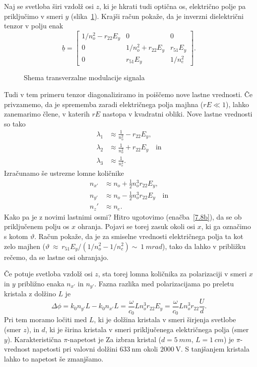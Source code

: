 Naj se svetloba širi vzdolž osi $z$, ki je hkrati tudi optična os, 
električno polje pa priključimo v smeri $y$ (slika~\ref{fig:tmshema}). 
Krajši račun pokaže, da je inverzni dielektrični tenzor v polju enak
\begin{equation}
\underline{b} = 
 \left[\begin{array}{ccc}
1/n_o^2  -r_{22}E_y& 0& 0\\
0& 1/n_o^2+r_{22}E_y& r_{51}E_y\\
0 & r_{51}E_y&  1/n_e^2
\end{array}\right].
\label{7.8b}
\end{equation}

\begin{figure}[ht]
\centering
\def\svgwidth{80truemm} 

\caption{Shema transverzalne modulacije signala}
\label{fig:tmshema}
\end{figure}

Tudi v tem primeru tenzor diagonaliziramo in poiščemo nove lastne vrednosti.
Če privzamemo, da je sprememba zaradi električnega polja majhna ($rE\ll1$), lahko
zanemarimo člene, v katerih $rE$ nastopa v kvadratni obliki. Nove lastne vrednosti so tako
\begin{align}
\lambda_1 &\approx \frac{1}{n_o^2}-r_{22}E_y, \\
\lambda_2 &\approx \frac{1}{n_o^2}+ r_{22}E_y\quad \mathrm{in} \\
\lambda_3 &\approx \frac{1}{n_e^2}.
\end{align}
Izračunamo še ustrezne lomne količnike 
\begin{align}
n_{x'} &\approx n_o+\frac{1}{2}n_o^3r_{22}E_y,\\
n_{y'} &\approx n_o-\frac{1}{2}n_o^3r_{22}E_y \quad \mathrm{in}\\
n_z' &\approx n_e.
\end{align}
Kako pa je z novimi lastnimi osmi? 
Hitro ugotovimo (enačba~\ref{7.8b}), da se ob
priključenem polju os $x$ ohranja. Pojavi se torej zasuk okoli osi $x$,
ki ga označimo s kotom $\vartheta$. Račun pokaže, da je za smiselne
vrednosti električnega polja ta kot zelo majhen ($\vartheta~
\approx~r_{51}E_y/(1/n_o^2-1/n_e^2) \sim~1~\si{mrad}$),
tako da lahko v približku rečemo, da se lastne osi ohranjajo. 

Če potuje svetloba vzdolž osi $z$, sta torej lomna količnika za 
polarizaciji v smeri $x$ in $y$ približno enaka $n_{x'}$ in $n_{y'}$. Fazna razlika med 
polarizacijama po preletu kristala z dolžino $L$ je 
\begin{equation}
\Delta \phi = k_0 n_{y'} L - k_0 n_{x'} L = \frac{\omega}{c_0}L 
n_o^3 r_{22}E_y = \frac{\omega}{c_0}L n_o^3 r_{22}\frac{U}{d}.
\label{fazaTM}
\end{equation}
Pri tem moramo ločiti med $L$, ki je dolžina kristala v smeri širjenja svetlobe
(smer $z$), in $d$, ki je širina kristala v smeri priključenega električnega polja 
(smer $y$). 
Karakteristična $\pi$-napetost je 
Za izbran kristal ($d=5~\si{mm}$, $L=1~\si{cm}$) je $\pi$-vrednost 
napetosti pri valovni dolžini $633~\si{\nano\metre}$ okoli $2000~\si{\volt}$. S tanjšanjem
kristala lahko to napetost še zmanjšamo.

